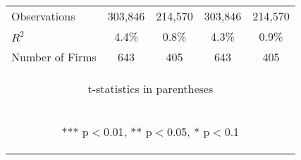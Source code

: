 \documentclass[border=0.2cm]{standalone}
\begin{document}
\begin{tabular}{lcccc}
    Observations      & 303,846                                         & 214,570                                        & 303,846                                        & 214,570                                        \\
    $R^2$             & 4.4\%                                           & 0.8\%                                          & 4.3\%                                          & 0.9\%                                          \\
    Number of Firms   & 643                                             & 405                                            & 643                                            & 405                                            \\ 
    \bottomrule
    \multicolumn{5}{c}{\begin{footnotesize} t-statistics in parentheses\end{footnotesize}}                                                                                                                                 \\
    \multicolumn{5}{c}{\begin{footnotesize} *** p$<$0.01, ** p$<$0.05, * p$<$0.1\end{footnotesize}}                                                                                                                        \\
\end{tabular}
\end{document}
